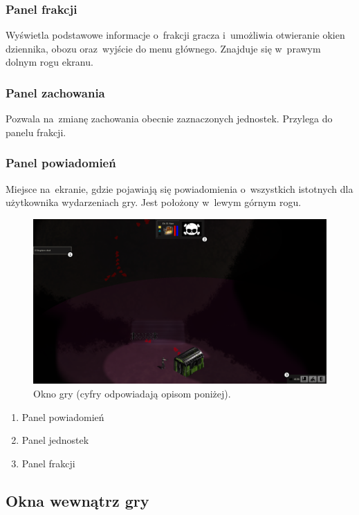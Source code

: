 \documentclass[licencjacka]{pracamgr}
\begin{document}
      \subsubsection{Panel frakcji}
	Wyświetla podstawowe informacje o~frakcji gracza i~umożliwia otwieranie okien dziennika, obozu oraz~wyjście do menu głównego.
	Znajduje się w~prawym dolnym rogu ekranu.
      \subsubsection{Panel zachowania}
	Pozwala na~zmianę zachowania obecnie zaznaczonych jednostek. Przylega do panelu frakcji.
      \subsubsection{Panel powiadomień}
	Miejsce na~ekranie, gdzie pojawiają się powiadomienia o~wszystkich istotnych dla użytkownika wydarzeniach gry. Jest położony w~lewym górnym rogu.

      \begin{figure}[htbp]
	\centering
	\includegraphics[scale=0.22]{Game.png}
	\caption{Okno gry (cyfry odpowiadają opisom poniżej).}
      \end{figure}

      \begin{enumerate}
       \item Panel powiadomień
       \item Panel jednostek
       \item Panel frakcji
      \end{enumerate}

    \subsection{Okna wewnątrz gry}
\end{document}
